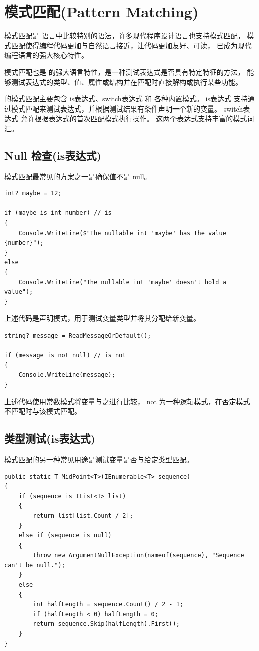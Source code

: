 \section{模式匹配(Pattern Matching)}

模式匹配是 \cs 语言中比较特别的语法，许多现代程序设计语言也支持模式匹配，
模式匹配使得编程代码更加与自然语言接近，让代码更加友好、可读，
已成为现代编程语言的强大核心特性。

模式匹配也是 \cs 的强大语言特性，是一种测试表达式是否具有特定特征的方法，
能够测试表达式的类型、值、属性或结构并在匹配时直接解构或执行某些功能。

\cs 的模式匹配主要包含 is表达式、switch表达式 和 各种内置模式。
is表达式 支持通过模式匹配来测试表达式，并根据测试结果有条件声明一个新的变量。
switch表达式 允许根据表达式的首次匹配模式执行操作。 这两个表达式支持丰富的模式词汇。

\subsection{Null 检查(is表达式)}

模式匹配最常见的方案之一是确保值不是 null。

\begin{lstlisting}
int? maybe = 12;

if (maybe is int number) // is
{
    Console.WriteLine($"The nullable int 'maybe' has the value {number}");
}
else
{
    Console.WriteLine("The nullable int 'maybe' doesn't hold a value");
}
\end{lstlisting}

上述代码是声明模式，用于测试变量类型并将其分配给新变量。

\begin{lstlisting}
string? message = ReadMessageOrDefault();

if (message is not null) // is not
{
    Console.WriteLine(message);
}
\end{lstlisting}

上述代码使用常数模式将变量与之进行比较， not 为一种逻辑模式，在否定模式不匹配时与该模式匹配。

\subsection{类型测试(is表达式)}

模式匹配的另一种常见用途是测试变量是否与给定类型匹配。

\begin{lstlisting}
public static T MidPoint<T>(IEnumerable<T> sequence)
{
    if (sequence is IList<T> list)
    {
        return list[list.Count / 2];
    }
    else if (sequence is null)
    {
        throw new ArgumentNullException(nameof(sequence), "Sequence can't be null.");
    }
    else
    {
        int halfLength = sequence.Count() / 2 - 1;
        if (halfLength < 0) halfLength = 0;
        return sequence.Skip(halfLength).First();
    }
}
\end{lstlisting}

